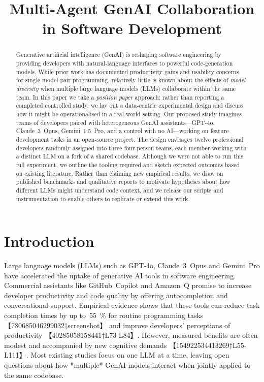 \documentclass[conference]{IEEEtran}
\title{\textbf{Multi‑Agent GenAI Collaboration in Software Development}}
\author{\IEEEauthorblockN{Anonymous Author(s)}%
\IEEEauthorblockA{Institution\thanks{Corresponding author email: example@domain.com}}}
\begin{document}
\maketitle

\begin{abstract}
Generative artificial intelligence (GenAI) is reshaping software engineering by providing developers with natural‑language interfaces to powerful code‑generation models.  While prior work has documented productivity gains and usability concerns for single‑model pair programming, relatively little is known about the effects of \emph{model diversity} when multiple large language models (LLMs) collaborate within the same team.  In this paper we take a \emph{position paper} approach: rather than reporting a completed controlled study, we lay out a data‑centric experimental design and discuss how it might be operationalised in a real‑world setting.  Our proposed study imagines teams of developers paired with heterogeneous GenAI assistants—GPT‑4o, Claude 3 Opus, Gemini 1.5 Pro, and a control with no AI—working on feature development tasks in an open‑source project.  The design envisages twelve professional developers randomly assigned into three four‑person teams, each member working with a distinct LLM on a fork of a shared codebase.  Although we were not able to run this full experiment, we outline the tooling required and sketch expected outcomes based on existing literature.  Rather than claiming new empirical results, we draw on published benchmarks and qualitative reports to motivate hypotheses about how different LLMs might understand code context, and we release our scripts and instrumentation to enable others to replicate or extend this work.
\end{abstract}

\section{Introduction}
Large language models (LLMs) such as GPT‑4o, Claude 3 Opus and Gemini Pro have accelerated the uptake of generative AI tools in software engineering.  Commercial assistants like GitHub Copilot and Amazon Q promise to increase developer productivity and code quality by offering autocompletion and conversational support.  Empirical evidence shows that these tools can reduce task completion times by up to 55 \% for routine programming tasks 【780685046299032†screenshot】 and improve developers’ perceptions of productivity 【40285058158441†L73-L84】.  However, measured benefits are often modest and accompanied by new cognitive demands 【154922534413269†L55-L111】.  Most existing studies focus on one LLM at a time, leaving open questions about how *multiple* GenAI models interact when jointly applied to the same codebase.
\end{document}

